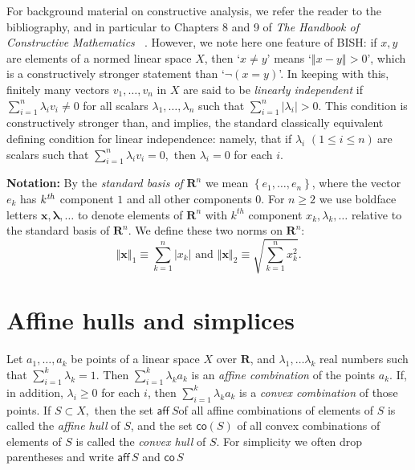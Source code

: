 \documentclass[11pt]{article}%
\begin{document}
For background material on constructive analysis, we refer the reader to the
bibliography, and in particular to Chapters 8 and 9 of \emph{The Handbook of
Constructive Mathematics \ }\cite{Handbook}. However, we note here one feature
of BISH: if $x,y$ are elements of a normed linear space $X$, then `$x\neq y$'
means `$\left\Vert x-y\right\Vert >0$', which is a constructively stronger
statement than `$\lnot(x=y)$'. In keeping with this, finitely many vectors
$v_{1},\ldots,v_{n}$ in $X$ are said to be \emph{linearly independent} if
$\sum\limits_{i=1}^{n}\lambda_{i}v_{i}\neq0$ for all scalars $\lambda
_{1},\ldots,\lambda_{n}$ such that $\sum\limits_{i=1}^{n}\left\vert
\lambda_{i}\right\vert >0.$ This condition is constructively stronger than,
and implies, the standard classically equivalent defining condition for linear
independence: namely, that if $\lambda_{i}$ $(1\leq i\leq n)\ $are scalars
such that $\sum\limits_{i=1}^{n}\lambda_{i}v_{i}=0,$ then $\lambda_{i}=0$ for
each $i$.%

\medskip
\noindent
\textbf{Notation: }By the \emph{standard basis of} $\mathbf{R}^{n}$ we mean
$\left\{  e_{1},\ldots,e_{n}\right\}  $, where the vector $e_{k}$ has
$k^{\text{\emph{th}}}$ component $1$ and all other components $0$. For
$n\geq2$ we use boldface letters $\mathbf{x},\mathbf{\lambda},\ldots$ to
denote elements of $\mathbf{R}^{n}$ with $k^{th}$ component $x_{k},\lambda
_{k},\ldots$ relative to the standard basis of $\mathbf{R}^{n}$. We define
these two norms on $\mathbf{R}^{n}:$%
\[
\left\Vert \mathbf{x}\right\Vert _{1}\equiv\sum_{k=1}^{n}\left\vert
x_{k}\right\vert \text{ \ and \ }\left\Vert \mathbf{x}\right\Vert _{2}%
\equiv\sqrt{\sum_{k=1}^{n}x_{k}^{2}}\text{.}%
\]%
\medskip


\section{Affine hulls and simplices}

Let $a_{1},\ldots,a_{k}$ be points of a linear space $X$ over $\mathbf{R}$,
and $\lambda_{1},\ldots\lambda_{k}$ real numbers such that $\sum_{i=1}%
^{k}\lambda_{k}=1$. Then $\sum_{i=1}^{k}\lambda_{k}a_{k}$ is an \emph{affine
combination} of the points $a_{k}$. If, in addition, $\lambda_{i}\geq0$ for
each $i$, then $\sum_{i=1}^{k}\lambda_{k}a_{k}$ is a \emph{convex combination
}of those points. If $S\subset X,$ then the set $\mathsf{aff}\ S$of all affine
combinations of elements of $S$ is called the \emph{affine hull }of $S$, and
the set $\mathsf{co}(S)$ of all convex combinations of elements of $S$ is
called the \emph{convex hull} of $S$. For simplicity we often drop parentheses
and write $\mathsf{aff\,}S$ and $\mathsf{co\,}S$
\end{document}
